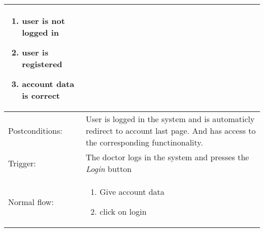 \begin{longtable}{| p{3.5cm} | p{9cm} |}
\begin{enumerate}
\item user is not logged in
\item user is registered
\item account data is correct
\end{enumerate}\\
\hline
Postconditions: & User is logged in the system and is automaticly redirect to account last page. And has access to the corresponding functinonality.\\
\hline
Trigger: & The doctor logs in the system and presses the \textit{Login} button\\
\hline
Normal flow: &\mbox{}\par\vspace{-\baselineskip}
\begin{enumerate}
\item Give account data
\item click on login
\end{enumerate}\\
\hline
\end{longtable}





